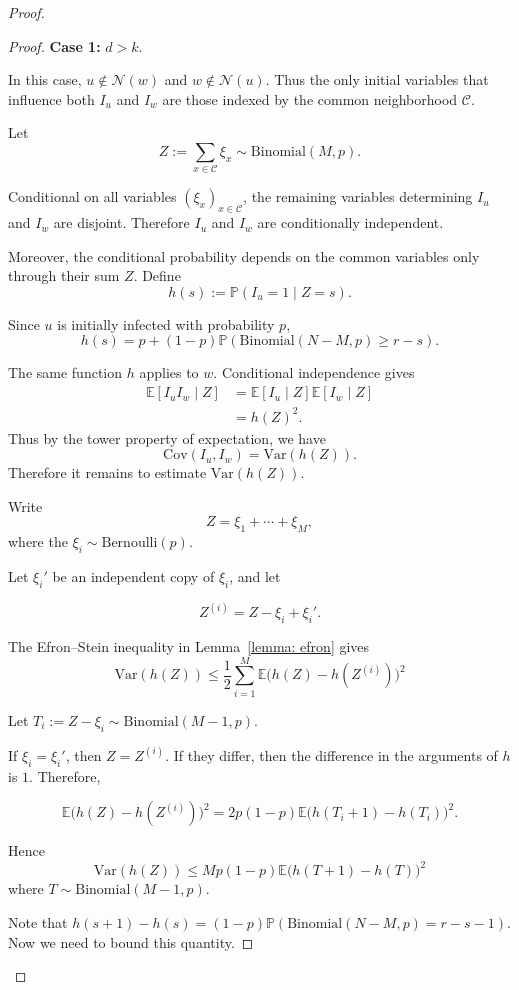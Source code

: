 \documentclass[reqno,11pt]{amsart}
\renewcommand{\le}{\leqslant}
\renewcommand{\ge}{\geqslant}
\begin{document}
\begin{proof}
\begin{proof}
\textbf{Case 1:} $d >k$.

In this case, $u\notin \mathcal{N}(w)$ and $w\notin \mathcal{N}(u)$. Thus the only initial variables that influence both $I_u$ and $I_w$ are those indexed by the common neighborhood $\mathcal C$.

Let
$$ Z:=\sum_{x\in\mathcal C}\xi_x \sim \text{Binomial}(M,p).
$$

Conditional on all variables $(\xi_x)_{x\in\mathcal C}$, the remaining variables determining $I_u$ and $I_w$ are disjoint. Therefore $I_u$ and $I_w$ are conditionally independent.

Moreover, the conditional probability depends on the common variables only through their sum $Z$. Define
$$
h(s):= \mathbb{P}(I_u=1\mid Z=s).
$$

Since $u$ is initially infected with probability $p$,
$$h(s)= p+(1-p) \mathbb P\left( \text{Binomial}(N-M,p)\ge r-s
\right). $$



The same function $h$ applies to $w$. Conditional independence gives
\begin{align*}
\mathbb{E}[I_uI_w\mid Z]
&= \mathbb{E}[I_u\mid Z]\mathbb{E}[I_w\mid Z] \\
&= h(Z)^2.
\end{align*}
Thus by the tower property of expectation, we have 
$$\text{Cov}(I_u,I_w) =\text{Var}(h(Z)).$$
Therefore it remains to estimate $\text{Var}(h(Z))$.

Write
$$Z=\xi_1+\cdots+\xi_M,$$
where the $\xi_i \sim \text{Bernoulli}(p)$.

Let $\xi_i'$ be an independent copy of $\xi_i$, and let

$$Z^{(i)}= Z-\xi_i+\xi_i'.$$

The Efron–Stein inequality in Lemma~\ref{lemma: efron} gives
$$\text{Var}(h(Z)) \le\frac{1}{2} \sum_{i=1}^{M} \mathbb{E}
\bigl(h(Z)-h(Z^{(i)})\bigr)^2 $$

Let $T_i:=Z-\xi_i \sim \text{Binomial}(M-1,p)$.

If $\xi_i=\xi_i'$, then $Z=Z^{(i)}$. If they differ, then the difference in the arguments of $h$ is $1$. Therefore,

$$\mathbb{E}\bigl(h(Z)-h(Z^{(i)})\bigr)^2= 2p(1-p) \mathbb{E} \bigl(h(T_i+1)-h(T_i)\bigr)^2.
$$

Hence $$\text{Var}(h(Z)) \le Mp(1-p) \mathbb{E}\bigl(h(T+1)-h(T)\bigr)^2 $$
where $T\sim \text{Binomial}(M-1,p)$.

Note that 
$h(s+1)-h(s) =(1-p)\mathbb{P}\left(\text{Binomial}(N-M,p)=r-s-1
\right).$ Now we need to bound this quantity. 


\end{proof}
\end{proof}
\end{document}
